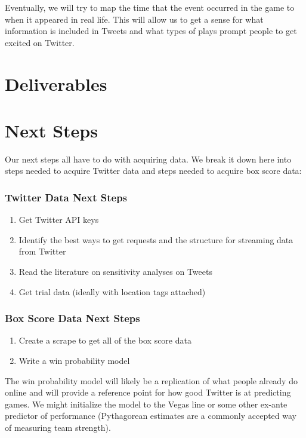\documentclass[12pt]{article}
\begin{document}
\noindent
Eventually, we will try to map the time that the event occurred in the game to when it appeared in real life. This will allow us to get a sense for what information is included in Tweets and what types of plays prompt people to get excited on Twitter.

\section{Deliverables}

\section{Next Steps}

Our next steps all have to do with acquiring data. We break it down here into steps needed to acquire Twitter data and steps needed to acquire box score data:

\subsubsection*{Twitter Data Next Steps}
\begin{enumerate}
	\item Get Twitter API keys
	\item Identify the best ways to get requests and the structure for streaming data from Twitter
	\item Read the literature on sensitivity analyses on Tweets
	\item Get trial data (ideally with location tags attached)
\end{enumerate}

\subsubsection*{Box Score Data Next Steps}
\begin{enumerate}
	\item Create a scrape to get all of the box score data
	\item Write a win probability model
\end{enumerate}

\noindent
The win probability model will likely be a replication of what people already do online and will provide a reference point for how good Twitter is at predicting games. We might initialize the model to the Vegas line or some other ex-ante predictor of performance (Pythagorean estimates are a commonly accepted way of measuring team strength). 
\end{document}
